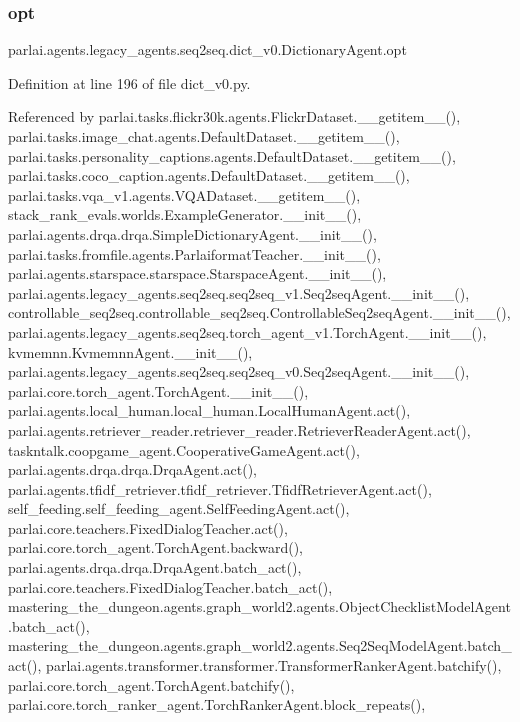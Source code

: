 \subsubsection{\texorpdfstring{opt}{opt}}
{\footnotesize\ttfamily parlai.\+agents.\+legacy\+\_\+agents.\+seq2seq.\+dict\+\_\+v0.\+Dictionary\+Agent.\+opt}



Definition at line 196 of file dict\+\_\+v0.\+py.



Referenced by parlai.\+tasks.\+flickr30k.\+agents.\+Flickr\+Dataset.\+\_\+\+\_\+getitem\+\_\+\+\_\+(), parlai.\+tasks.\+image\+\_\+chat.\+agents.\+Default\+Dataset.\+\_\+\+\_\+getitem\+\_\+\+\_\+(), parlai.\+tasks.\+personality\+\_\+captions.\+agents.\+Default\+Dataset.\+\_\+\+\_\+getitem\+\_\+\+\_\+(), parlai.\+tasks.\+coco\+\_\+caption.\+agents.\+Default\+Dataset.\+\_\+\+\_\+getitem\+\_\+\+\_\+(), parlai.\+tasks.\+vqa\+\_\+v1.\+agents.\+V\+Q\+A\+Dataset.\+\_\+\+\_\+getitem\+\_\+\+\_\+(), stack\+\_\+rank\+\_\+evals.\+worlds.\+Example\+Generator.\+\_\+\+\_\+init\+\_\+\+\_\+(), parlai.\+agents.\+drqa.\+drqa.\+Simple\+Dictionary\+Agent.\+\_\+\+\_\+init\+\_\+\+\_\+(), parlai.\+tasks.\+fromfile.\+agents.\+Parlaiformat\+Teacher.\+\_\+\+\_\+init\+\_\+\+\_\+(), parlai.\+agents.\+starspace.\+starspace.\+Starspace\+Agent.\+\_\+\+\_\+init\+\_\+\+\_\+(), parlai.\+agents.\+legacy\+\_\+agents.\+seq2seq.\+seq2seq\+\_\+v1.\+Seq2seq\+Agent.\+\_\+\+\_\+init\+\_\+\+\_\+(), controllable\+\_\+seq2seq.\+controllable\+\_\+seq2seq.\+Controllable\+Seq2seq\+Agent.\+\_\+\+\_\+init\+\_\+\+\_\+(), parlai.\+agents.\+legacy\+\_\+agents.\+seq2seq.\+torch\+\_\+agent\+\_\+v1.\+Torch\+Agent.\+\_\+\+\_\+init\+\_\+\+\_\+(), kvmemnn.\+Kvmemnn\+Agent.\+\_\+\+\_\+init\+\_\+\+\_\+(), parlai.\+agents.\+legacy\+\_\+agents.\+seq2seq.\+seq2seq\+\_\+v0.\+Seq2seq\+Agent.\+\_\+\+\_\+init\+\_\+\+\_\+(), parlai.\+core.\+torch\+\_\+agent.\+Torch\+Agent.\+\_\+\+\_\+init\+\_\+\+\_\+(), parlai.\+agents.\+local\+\_\+human.\+local\+\_\+human.\+Local\+Human\+Agent.\+act(), parlai.\+agents.\+retriever\+\_\+reader.\+retriever\+\_\+reader.\+Retriever\+Reader\+Agent.\+act(), taskntalk.\+coopgame\+\_\+agent.\+Cooperative\+Game\+Agent.\+act(), parlai.\+agents.\+drqa.\+drqa.\+Drqa\+Agent.\+act(), parlai.\+agents.\+tfidf\+\_\+retriever.\+tfidf\+\_\+retriever.\+Tfidf\+Retriever\+Agent.\+act(), self\+\_\+feeding.\+self\+\_\+feeding\+\_\+agent.\+Self\+Feeding\+Agent.\+act(), parlai.\+core.\+teachers.\+Fixed\+Dialog\+Teacher.\+act(), parlai.\+core.\+torch\+\_\+agent.\+Torch\+Agent.\+backward(), parlai.\+agents.\+drqa.\+drqa.\+Drqa\+Agent.\+batch\+\_\+act(), parlai.\+core.\+teachers.\+Fixed\+Dialog\+Teacher.\+batch\+\_\+act(), mastering\+\_\+the\+\_\+dungeon.\+agents.\+graph\+\_\+world2.\+agents.\+Object\+Checklist\+Model\+Agent.\+batch\+\_\+act(), mastering\+\_\+the\+\_\+dungeon.\+agents.\+graph\+\_\+world2.\+agents.\+Seq2\+Seq\+Model\+Agent.\+batch\+\_\+act(), parlai.\+agents.\+transformer.\+transformer.\+Transformer\+Ranker\+Agent.\+batchify(), parlai.\+core.\+torch\+\_\+agent.\+Torch\+Agent.\+batchify(), parlai.\+core.\+torch\+\_\+ranker\+\_\+agent.\+Torch\+Ranker\+Agent.\+block\+\_\+repeats(), 